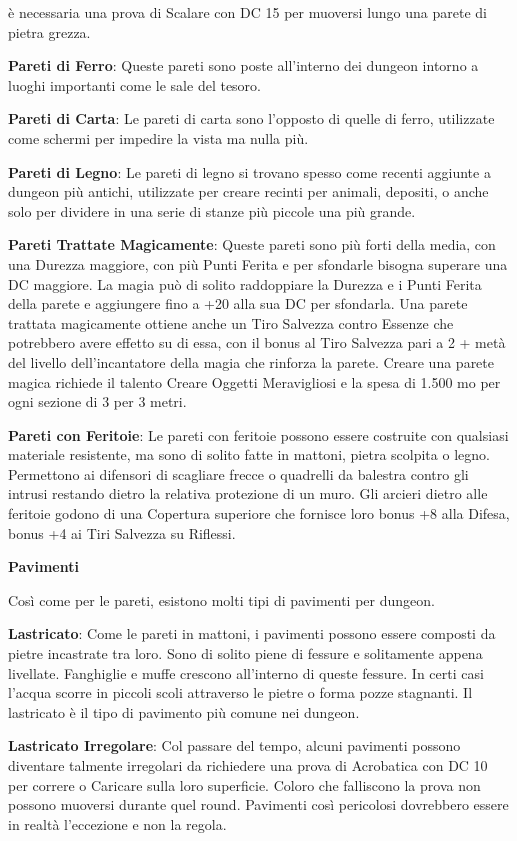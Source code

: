 \documentclass[a4paper,11pt,twoside,openany]{book}
\begin{document}
{è necessaria una prova di Scalare con DC 15 per muoversi lungo una parete di pietra grezza.

\textbf{Pareti di Ferro}: Queste pareti sono poste all'interno dei dungeon intorno a luoghi importanti come le sale del tesoro.

\textbf{Pareti di Carta}: Le pareti di carta sono l'opposto di quelle di ferro, utilizzate come schermi per impedire la vista ma nulla più.

\textbf{Pareti di Legno}: Le pareti di legno si trovano spesso come recenti aggiunte a dungeon più antichi, utilizzate per creare recinti per animali, depositi, o anche solo per dividere in una serie di stanze più piccole una più grande.

\textbf{Pareti Trattate Magicamente}: Queste pareti sono più forti della media, con una Durezza maggiore, con più Punti Ferita e per sfondarle bisogna superare una DC maggiore. La magia può di solito raddoppiare la Durezza e i Punti Ferita della parete e aggiungere fino a +20 alla sua DC per sfondarla. Una parete trattata magicamente ottiene anche un Tiro Salvezza contro Essenze che potrebbero avere effetto su di essa, con il bonus al Tiro Salvezza pari a 2 + metà del livello dell'incantatore della magia che rinforza la parete. Creare una parete magica richiede il talento Creare Oggetti Meravigliosi e la spesa di 1.500 mo per ogni sezione di 3 per 3 metri.

\textbf{Pareti con Feritoie}: Le pareti con feritoie possono essere costruite con qualsiasi materiale resistente, ma sono di solito fatte in mattoni, pietra scolpita o legno. Permettono ai difensori di scagliare frecce o quadrelli da balestra contro gli intrusi restando dietro la relativa protezione di un muro. Gli arcieri dietro alle feritoie godono di una Copertura superiore che fornisce loro bonus +8 alla Difesa, bonus +4 ai Tiri Salvezza su Riflessi.

\textbf{Pavimenti}

Così come per le pareti, esistono molti tipi di pavimenti per dungeon.

\textbf{Lastricato}: Come le pareti in mattoni, i pavimenti possono essere composti da pietre incastrate tra loro. Sono di solito piene di fessure e solitamente appena livellate. Fanghiglie e muffe crescono all'interno di queste fessure. In certi casi l'acqua scorre in piccoli scoli attraverso le pietre o forma pozze stagnanti. Il lastricato è il tipo di pavimento più comune nei dungeon.

\textbf{Lastricato Irregolare}: Col passare del tempo, alcuni pavimenti possono diventare talmente irregolari da richiedere una prova di Acrobatica con DC 10 per correre o Caricare sulla loro superficie. Coloro che falliscono la prova non possono muoversi durante quel round. Pavimenti così pericolosi dovrebbero essere in realtà l'eccezione e non la regola.

}
\end{document}
